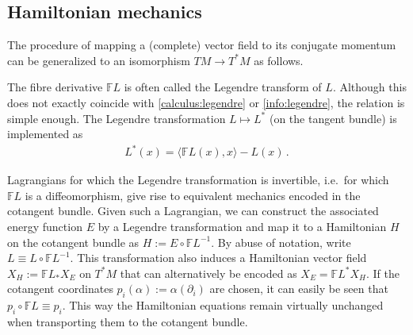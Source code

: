 \subsection{Hamiltonian mechanics}

    The procedure of mapping a (complete) vector field to its conjugate momentum can be generalized to an isomorphism $TM\rightarrow T^*M$ as follows.
    \begin{remark}
        The fibre derivative $\mathbb{F}L$ is often called the Legendre transform of $L$. Although this does not exactly coincide with \cref{calculus:legendre} or \cref{info:legendre}, the relation is simple enough. The Legendre transformation $L\mapsto L^*$ (on the tangent bundle) is implemented as
        \begin{gather}
            L^*(x) = \langle\mathbb{F}L(x),x\rangle - L(x)\,.
        \end{gather}
    \end{remark}

    Lagrangians for which the Legendre transformation is invertible, i.e.~for which $\mathbb{F}L$ is a diffeomorphism, give rise to equivalent mechanics encoded in the cotangent bundle. Given such a Lagrangian, we can construct the associated energy function $E$ by a Legendre transformation and map it to a Hamiltonian $H$ on the cotangent bundle as $H:=E\circ\mathbb{F}L^{-1}$. By abuse of notation, write $L\equiv L\circ\mathbb{F}L^{-1}$. This transformation also induces a Hamiltonian vector field $X_H:=\mathbb{F}L_*X_E$ on $T^*M$ that can alternatively be encoded as $X_E=\mathbb{F}L^*X_H$. If the cotangent coordinates $p_i(\alpha) := \alpha(\partial_i)$ are chosen, it can easily be seen that $p_i\circ\mathbb{F}L\equiv p_i$. This way the Hamiltonian equations remain virtually unchanged when transporting them to the cotangent bundle.

